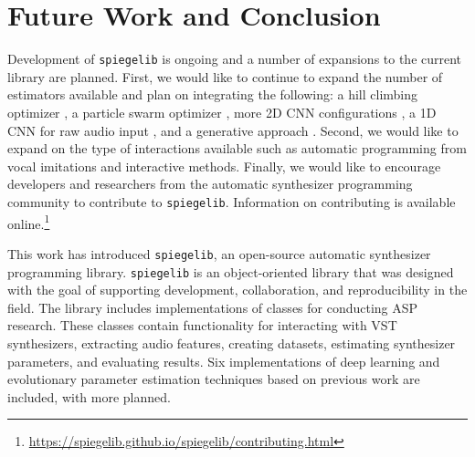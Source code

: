 \section{Future Work and Conclusion}
Development of \texttt{spiegelib} is ongoing and a number of expansions to the current library are planned. First, we would like to continue to expand the number of estimators available and plan on integrating the following: a hill climbing optimizer \cite{yee2018automatic}, a particle swarm optimizer \cite{heise2009automatic}, more 2D CNN configurations \cite{barkan2019inversynth}, a 1D CNN for raw audio input \cite{barkan2019inversynth}, and a generative approach \cite{esling2020flow}.  Second, we would like to expand on the type of interactions available such as automatic programming from vocal imitations \cite{mcartwright2014} and interactive methods. 
Finally, we would like to encourage developers and researchers from the automatic synthesizer programming community to contribute to \texttt{spiegelib}. Information on contributing is available online.\footnote{\url{https://spiegelib.github.io/spiegelib/contributing.html}} 

This work has introduced \texttt{spiegelib}, an open-source automatic synthesizer programming library. \texttt{spiegelib} is an object-oriented library that was designed with the goal of supporting development, collaboration, and reproducibility in the field. The library includes implementations of classes for conducting ASP research. These classes contain functionality for interacting with VST synthesizers, extracting audio features, creating datasets, estimating synthesizer parameters, and evaluating results. Six implementations of deep learning and evolutionary parameter estimation techniques based on previous work are included, with more planned.